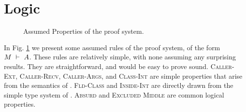 \newpage
\section{\SpecO Logic}
\label{app:assert_logic}


{
\begin{figure}[ht]
\footnotesize
{}
\normalsize
\caption{Assumed Properties of the \SpecO proof system.}
\label{f:assertProperties}
\end{figure}}

In Fig. \ref{f:assertProperties} we present some assumed rules of the 
\SpecO proof system, of the form $M\ \vdash\ A$. These rules
are relatively simple, with none assuming any surprising results.
They are straightforward, and would be easy to prove sound. 
\textsc{Caller-Ext}, \textsc{Caller-Recv}, \textsc{Caller-Args},
and \textsc{Class-Int} are simple properties that arise from 
the semantics of \SpecO.
\textsc{Fld-Class} and \textsc{Inside-Int} are directly drawn from 
the simple type system of \Loo.
\textsc{Absurd} and \textsc{Excluded Middle} are common logical properties.